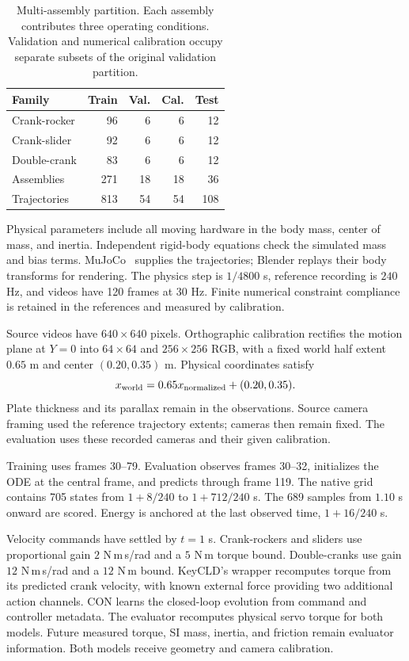 \begin{table}[t]
\caption{Multi-assembly partition. Each assembly contributes three operating conditions. Validation and numerical calibration occupy separate subsets of the original validation partition.}
\label{app:corpus-splits}
\centering\small
\begin{tabular}{lrrrr}
\toprule
Family & Train & Val. & Cal. & Test\\
\midrule
Crank-rocker & 96 & 6 & 6 & 12\\
Crank-slider & 92 & 6 & 6 & 12\\
Double-crank & 83 & 6 & 6 & 12\\
\midrule
Assemblies & 271 & 18 & 18 & 36\\
Trajectories & 813 & 54 & 54 & 108\\
\bottomrule
\end{tabular}
\end{table}

Physical parameters include all moving hardware in the body mass, center of mass, and inertia. Independent rigid-body equations check the simulated mass and bias terms. MuJoCo~\cite{todorov2012mujoco} supplies the trajectories; Blender replays their body transforms for rendering. The physics step is $1/4800$ s, reference recording is $240$ Hz, and videos have 120 frames at $30$ Hz. Finite numerical constraint compliance is retained in the references and measured by calibration.

Source videos have $640\times640$ pixels. Orthographic calibration rectifies the motion plane at $Y=0$ into $64\times64$ and $256\times256$ RGB, with a fixed world half extent $0.65$ m and center $(0.20,0.35)$ m. Physical coordinates satisfy
\begin{equation}
x_{\rm world}=0.65x_{\rm normalized}+(0.20,0.35).
\end{equation}
Plate thickness and its parallax remain in the observations. Source camera framing used the reference trajectory extents; cameras then remain fixed. The evaluation uses these recorded cameras and their given calibration.

Training uses frames 30--79. Evaluation observes frames 30--32, initializes the ODE at the central frame, and predicts through frame 119. The native grid contains 705 states from $1+8/240$ to $1+712/240$ s. The 689 samples from $1.10$ s onward are scored. Energy is anchored at the last observed time, $1+16/240$ s.

Velocity commands have settled by $t=1$ s. Crank-rockers and sliders use proportional gain $2$ N\,m\,s/rad and a $5$ N\,m torque bound. Double-cranks use gain $12$ N\,m\,s/rad and a $12$ N\,m bound. KeyCLD's wrapper recomputes torque from its predicted crank velocity, with known external force providing two additional action channels. CON learns the closed-loop evolution from command and controller metadata. The evaluator recomputes physical servo torque for both models. Future measured torque, SI mass, inertia, and friction remain evaluator information. Both models receive geometry and camera calibration.

